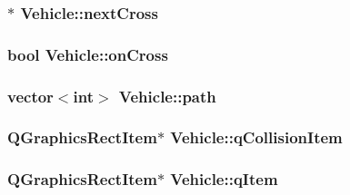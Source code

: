 \hypertarget{class_vehicle_a32fb5373b1808c23c25124ea2ce66b8c}{
\subsubsection[{next\-Cross}]{$\ast$ Vehicle\-::next\-Cross\hspace{0.3cm}{\ttfamily [private]}}}\label{class_vehicle_a32fb5373b1808c23c25124ea2ce66b8c}
\hypertarget{class_vehicle_a7a5fe72aaf4d2f119a4dc58c4b35e36e}{
\subsubsection[{on\-Cross}]{\setlength{\rightskip}{0pt plus 5cm}bool Vehicle\-::on\-Cross\hspace{0.3cm}{\ttfamily [private]}}}\label{class_vehicle_a7a5fe72aaf4d2f119a4dc58c4b35e36e}
\hypertarget{class_vehicle_a8379932487731fc05e7c88bd0609c802}{
\subsubsection[{path}]{\setlength{\rightskip}{0pt plus 5cm}vector$<$int$>$ Vehicle\-::path\hspace{0.3cm}{\ttfamily [private]}}}\label{class_vehicle_a8379932487731fc05e7c88bd0609c802}
\hypertarget{class_vehicle_a9bf00c3b511e214ab95d5da12e49633c}{
\subsubsection[{q\-Collision\-Item}]{\setlength{\rightskip}{0pt plus 5cm}Q\-Graphics\-Rect\-Item$\ast$ Vehicle\-::q\-Collision\-Item\hspace{0.3cm}{\ttfamily [private]}}}\label{class_vehicle_a9bf00c3b511e214ab95d5da12e49633c}
\hypertarget{class_vehicle_a6de375e22bd723ba487c50489e569548}{
\subsubsection[{q\-Item}]{\setlength{\rightskip}{0pt plus 5cm}Q\-Graphics\-Rect\-Item$\ast$ Vehicle\-::q\-Item\hspace{0.3cm}{\ttfamily [private]}}}\label{class_vehicle_a6de375e22bd723ba487c50489e569548}
